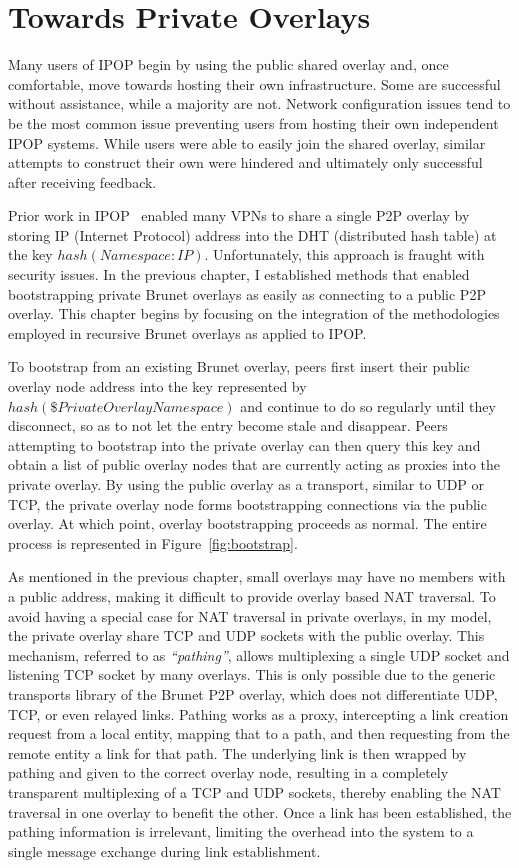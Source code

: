 \section{Towards Private Overlays}
\label{vpn:private_overlays}

Many users of IPOP begin by using the public shared overlay and, once
comfortable, move towards hosting their own infrastructure.  Some are
successful without assistance, while a majority are not.  Network configuration
issues tend to be the most common issue preventing users from hosting their own
independent IPOP systems.  While users were able to easily join the shared
overlay, similar attempts to construct their own were hindered and ultimately
only successful after receiving feedback.

Prior work in IPOP~\cite{pcgrid07} enabled many VPNs to share a single P2P
overlay by storing IP (Internet Protocol) address into the DHT (distributed
hash table) at the key $hash(Namespace:IP)$.  Unfortunately, this approach is
fraught with security issues.  In the previous chapter, I established methods
that enabled bootstrapping private Brunet overlays as easily as connecting to a
public P2P overlay.  This chapter begins by focusing on the integration of the
methodologies employed in recursive Brunet overlays as applied to IPOP.

To bootstrap from an existing Brunet overlay, peers first insert their public
overlay node address into the key represented by $hash(\$Private Overlay
Namespace)$ and continue to do so regularly until they disconnect, so as to not
let the entry become stale and disappear.  Peers attempting to bootstrap into
the private overlay can then query this key and obtain a list of public overlay
nodes that are currently acting as proxies into the private overlay.  By using
the public overlay as a transport, similar to UDP or TCP, the private overlay
node forms bootstrapping connections via the public overlay.  At which point,
overlay bootstrapping proceeds as normal.  The entire process is represented in
Figure~\ref{fig:bootstrap}.

As mentioned in the previous chapter, small overlays may have no members with a
public address, making it difficult to provide overlay based NAT traversal.  To
avoid having a special case for NAT traversal in private overlays, in my model,
the private overlay share TCP and UDP sockets with the public overlay.  This
mechanism, referred to as {\em ``pathing''}, allows multiplexing a single UDP
socket and listening TCP socket by many overlays.  This is only possible due to
the generic transports library of the Brunet P2P overlay, which does not
differentiate UDP, TCP, or even relayed links.  Pathing works as a proxy,
intercepting a link creation request from a local entity, mapping that to a
path, and then requesting from the remote entity a link for that path.  The
underlying link is then wrapped by pathing and given to the correct overlay
node, resulting in a completely transparent multiplexing of a TCP and UDP
sockets, thereby enabling the NAT traversal in one overlay to benefit the
other.  Once a link has been established, the pathing information is
irrelevant, limiting the overhead into the system to a single message exchange
during link establishment.

